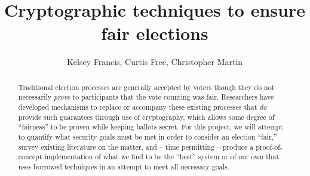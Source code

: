 \documentclass[10pt]{article}
\title{Cryptographic techniques to ensure fair elections}
\date{}
\author{Kelsey Francis, Curtis Free, Christopher Martin}
\begin{document}
	\maketitle

	\begin{abstract}
		Traditional election processes are generally accepted by voters though they do not necessarily
		\emph{prove} to participants that the vote counting was fair. Researchers have developed
		mechanisms to replace or accompany these existing processes that \emph{do} provide such
		guarantees through use of cryptography, which allows some degree of ``fairness'' to be proven
		while keeping ballots secret. For this project, we will attempt to quantify what security goals
		must be met in order to consider an election ``fair,'' survey existing literature on the matter,
		and -- time permitting -- produce a proof-of-concept implementation of what we find to be the
		``best'' system or of our own that uses borrowed techniques in an attempt to meet all necessary
		goals.
	\end{abstract}
\end{document}
